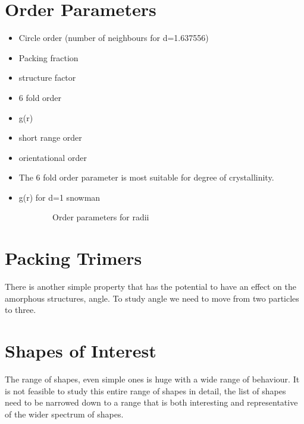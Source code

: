 \section{Order Parameters}

\begin{itemize}
    \item Circle order (number of neighbours for d=1.637556)
    \item Packing fraction
    \item structure factor
    \item 6 fold order
    \item g(r)
    \item short range order
    \item orientational order
\end{itemize}

\begin{itemize}
    \item The 6 fold order parameter is most suitable for degree of crystallinity.
    \item g(r) for d=1 snowman
\end{itemize}


\begin{figure}
    \begin{subfigure}{0.5\textwidth}
        \caption{Order parameters for radii}
    \end{subfigure}
    \begin{subfigure}{0.5\textwidth}
    \end{subfigure}
\end{figure}

\section{Packing Trimers}
\label{packing trimers}

There is another simple property that has the potential to have an effect on the amorphous structures, angle. To study angle we need to move from two particles to three.

\section{Shapes of Interest}
\label{shapes of interest}

The range of shapes, even simple ones is huge with a wide range of behaviour. It is not feasible to study this entire range of shapes in detail, the list of shapes need to be narrowed down to a range that is both interesting and representative of the wider spectrum of shapes.


